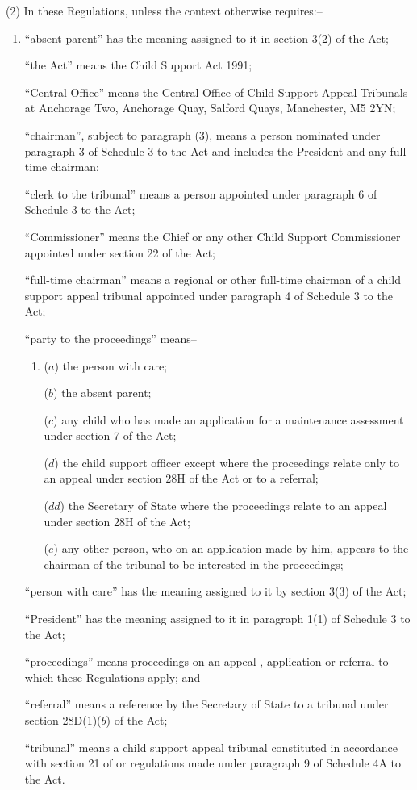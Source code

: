 \documentclass[a4paper]{article}
\begin{document}
(2) In these Regulations, unless the context otherwise requires:–
\begin{enumerate}\item[]
“absent parent” has the meaning assigned to it in section 3(2) of the Act;

“the Act” means the Child Support Act 1991;

“Central Office” means the Central Office of Child Support Appeal Tribunals at Anchorage Two, Anchorage Quay, Salford Quays, Manchester, M5 2YN;

“chairman”, subject to paragraph (3), means a person nominated under paragraph 3 of Schedule 3 to the Act and includes the President and any full-time chairman;

“clerk to the tribunal” means a person appointed under paragraph 6 of Schedule 3 to the Act;

“Commissioner” means the Chief or any other Child Support Commissioner appointed under section 22 of the Act;

“full-time chairman” means a regional or other full-time chairman of a child support appeal tribunal appointed under paragraph 4 of Schedule 3 to the Act;

“party to the proceedings” means–
\begin{enumerate}\item[]
($a$) the person with care;

($b$) the absent parent;

($c$) any child who has made an application for a maintenance assessment under section 7 of the Act;

($d$) the child support officer
except where the proceedings relate only to an appeal under section 28H
of the Act or to a referral;  %

($dd$) the Secretary of State where the proceedings relate to an appeal under
section 28H of the Act;

($e$) any other person, who on an application made by him, appears to the chairman of the tribunal to be interested in the proceedings;
\end{enumerate}

“person with care” has the meaning assigned to it by section 3(3) of the Act;

“President” has the meaning assigned to it in paragraph 1(1) of Schedule 3 to the Act;

“proceedings” means proceedings on an appeal%
, application or referral  %
to which these Regulations apply; and

“referral” means a reference by the Secretary of State to a tribunal under
section 28D(1)($b$) of the Act;

“tribunal” means a child support appeal tribunal constituted in accordance with section 21 of 
or regulations made under paragraph 9 of Schedule 4A
to  %
the Act.
\end{enumerate}
\end{document}
